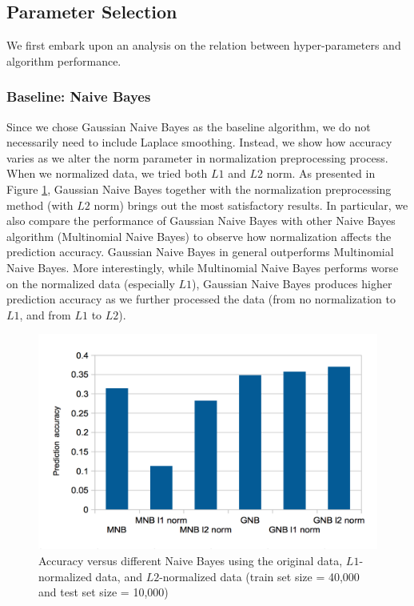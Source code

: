 \documentclass{acm_proc_article-sp}
\begin{document}
\subsection{Parameter Selection}
We first embark upon an analysis on the relation between hyper-parameters and algorithm performance.
 
\subsubsection{Baseline: Naive Bayes}
Since we chose Gaussian Naive Bayes as the baseline algorithm, we do not necessarily need to include Laplace smoothing. Instead, we show how accuracy varies as we alter the norm parameter in normalization preprocessing process. When we normalized data, we tried both $L1$ and $L2$ norm.  As presented in  Figure \ref{fig:gnbparam}, Gaussian Naive Bayes together with the normalization preprocessing method (with $L2$ norm) brings out the most satisfactory results.   In particular, we also compare the performance of Gaussian Naive Bayes with other Naive Bayes algorithm (Multinomial Naive Bayes) to  observe how normalization affects the prediction accuracy. Gaussian Naive Bayes in general outperforms Multinomial Naive Bayes. More interestingly,  while Multinomial Naive Bayes performs worse on the normalized data (especially $L1$),  Gaussian Naive Bayes produces higher prediction accuracy as we further processed the data (from no normalization to $L1$, and from $L1$ to $L2$).
\begin{figure} 
\centering
\includegraphics[width=0.9\columnwidth]{graphs/gnb_param.png}  
\caption{Accuracy versus different Naive Bayes using the original data, $L1$-normalized data, and $L2$-normalized data (train set size = 40,000 and test set size = 10,000)}
\label{fig:gnbparam}
\end{figure}
\end{document}
